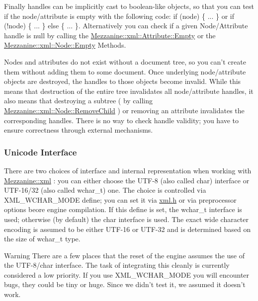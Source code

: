  \par
 Finally handles can be implicitly cast to boolean-\/like objects, so that you can test if the node/attribute is empty with the following code: if (node) \{ ... \} or if (!node) \{ ... \} else \{ ... \}. Alternatively you can check if a given Node/Attribute handle is null by calling the \hyperlink{classMezzanine_1_1xml_1_1Attribute_af0729c966ed4f385e8791eb4c904b82f}{Mezzanine::xml::Attribute::Empty} or the \hyperlink{classMezzanine_1_1xml_1_1Node_a3143d34f7cd807136c0e08a9ee67ca41}{Mezzanine::xml::Node::Empty} Methods. \par
 \par
 Nodes and attributes do not exist without a document tree, so you can't create them without adding them to some document. Once underlying node/attribute objects are destroyed, the handles to those objects become invalid. While this means that destruction of the entire tree invalidates all node/attribute handles, it also means that destroying a subtree ( by calling \hyperlink{classMezzanine_1_1xml_1_1Node_adccef0985791506dc216f57cf6d46546}{Mezzanine::xml::Node::RemoveChild} ) or removing an attribute invalidates the corresponding handles. There is no way to check handle validity; you have to ensure correctness through external mechanisms. \par
 \par
 \hypertarget{XMLManual_XMLUnicode}{}\subsubsection{Unicode Interface}\label{XMLManual_XMLUnicode}
There are two choices of interface and internal representation when working with \hyperlink{namespaceMezzanine_1_1xml}{Mezzanine::xml} : you can either choose the UTF-\/8 (also called char) interface or UTF-\/16/32 (also called wchar\_\-t) one. The choice is controlled via XML\_\-WCHAR\_\-MODE define; you can set it via \hyperlink{xml_8h}{xml.h} or via preprocessor options beore engine compilation. If this define is set, the wchar\_\-t interface is used; otherwise (by default) the char interface is used. The exact wide character encoding is assumed to be either UTF-\/16 or UTF-\/32 and is determined based on the size of wchar\_\-t type. \begin{DoxyWarning}{Warning}
There are a few places that the reset of the engine assumes the use of the UTF-\/8/char interface. The task of integrating this cleanly is currently considered a low priority. If you use XML\_\-WCHAR\_\-MODE you will encounter bugs, they could be tiny or huge. Since we didn't test it, we assumed it doesn't work.
\end{DoxyWarning}
